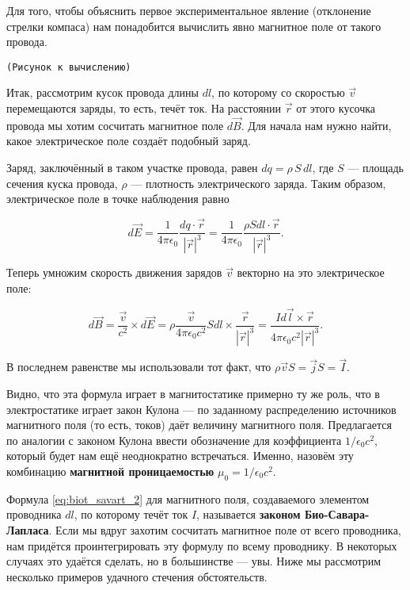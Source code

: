 \documentclass[a4paper,12pt]{article}
\newcommand{\eps}{\epsilon}
\newcommand{\com}[1]{{\Large{\texttt{{\color{red}(#1)}}}}}
\begin{document}
Для того, чтобы объяснить первое экспериментальное явление (отклонение
стрелки компаса) нам понадобится вычислить явно магнитное поле от
такого провода. 

\com{Рисунок к вычислению}

Итак, рассмотрим кусок провода длины $dl$, по которому со скоростью
$\vec{v}$ перемещаются заряды, то есть, течёт ток. На расстоянии
$\vec{r}$ от этого кусочка провода мы хотим сосчитать магнитное поле
$d\vec{B}$. Для начала нам нужно найти, какое электрическое поле
создаёт подобный заряд.

Заряд, заключённый в таком участке провода, равен $dq = \rho\, S\,
dl$, где $S$ — площадь сечения куска провода, $\rho$ — плотность
электрического заряда. Таким образом, электрическое поле в точке
наблюдения равно 

\begin{equation}
  \label{eq:biot_savart_1}
  d\vec{E} = \frac{1}{4\pi\eps_0} \frac{dq \cdot \vec{r}}{|\vec{r}|^3}
  = \frac{1}{4\pi\eps_0} \frac{\rho S dl
    \cdot \vec{r}}{|\vec{r}|^3}.
\end{equation}

Теперь умножим скорость движения зарядов $\vec{v}$ векторно на это
электрическое поле: 

\begin{equation}
  \label{eq:biot_savart_2}
  d\vec{B} = \frac{\vec{v}}{c^2}  \times d\vec{E} = \rho \frac{\vec{v}}{4\pi\eps_0c^2} S dl \times
  \frac{\vec{r}}{|\vec{r}|^3} = \frac{I d\vec{l} \times \vec{r}}{4\pi\eps_0c^2|\vec{r}|^3}.
\end{equation}

В последнем равенстве мы использовали тот факт, что $\rho \vec{v} S =
\vec{j} S = \vec{I}$. 

Видно, что эта формула играет в магнитостатике примерно ту же роль,
что в электростатике играет закон Кулона --- по заданному
распределению источников магнитного поля (то есть, токов) даёт
величину магнитного поля. Предлагается по аналогии с законом Кулона
ввести обозначение для коэффициента $1/\eps_0c^2$, который будет нам
ещё неоднократно встречаться. Именно, назовём эту комбинацию
\textbf{магнитной проницаемостью} $\mu_0 = 1/\eps_0c^2$. 


Формула \eqref{eq:biot_savart_2} для магнитного поля, создаваемого
элементом проводника $dl$, по которому течёт ток $I$, называется
\textbf{законом Био-Савара-Лапласа}. Если мы вдруг захотим сосчитать
магнитное поле от всего проводника, нам придётся проинтегрировать эту
формулу по всему проводнику. В некоторых случаях это удаётся сделать,
но в большинстве — увы. Ниже мы рассмотрим несколько примеров удачного
стечения обстоятельств. 
\end{document}
